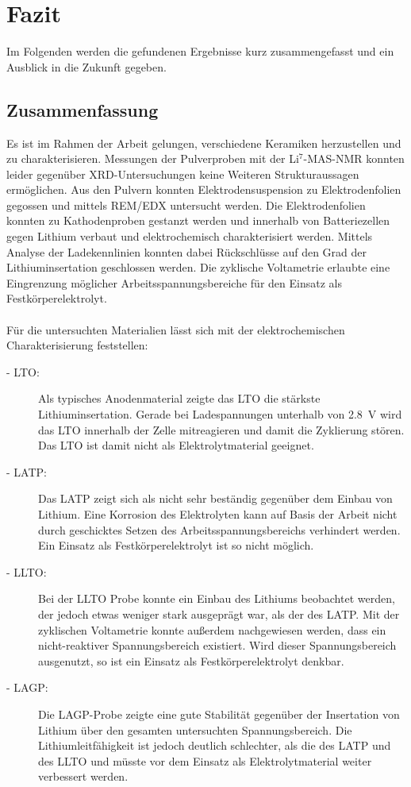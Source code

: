 \documentclass[a4paper, 11pt, headsepline,footsepline,twoside,abstract]{scrbook}
\begin{document}
\chapter{Fazit}
Im Folgenden werden die gefundenen Ergebnisse kurz zusammengefasst und ein Ausblick in die Zukunft gegeben.
\section{Zusammenfassung}
Es ist im Rahmen der Arbeit gelungen, verschiedene Keramiken herzustellen und zu charakterisieren. Messungen der Pulverproben mit der Li$^7$-MAS-NMR konnten leider gegenüber XRD-Untersuchungen keine Weiteren Strukturaussagen ermöglichen. Aus den Pulvern konnten Elektrodensuspension zu Elektrodenfolien gegossen und mittels REM/EDX untersucht werden. Die Elektrodenfolien konnten zu Kathodenproben gestanzt werden und innerhalb von Batteriezellen gegen Lithium verbaut und elektrochemisch charakterisiert werden. Mittels Analyse der Ladekennlinien konnten dabei Rückschlüsse auf den Grad der Lithiuminsertation geschlossen werden. Die zyklische Voltametrie erlaubte eine Eingrenzung möglicher Arbeitsspannungsbereiche für den Einsatz als Festkörperelektrolyt. %
\\\\
Für die untersuchten Materialien lässt sich mit der elektrochemischen Charakterisierung feststellen:
\begin{description}
\item[- LTO:] Als typisches Anodenmaterial zeigte das LTO die stärkste Lithiuminsertation. Gerade bei Ladespannungen unterhalb von \SI{2.8}{\volt} wird das LTO innerhalb der Zelle mitreagieren und damit die Zyklierung stören. Das LTO ist damit nicht als Elektrolytmaterial geeignet.
\item[- LATP:] Das LATP zeigt sich als nicht sehr beständig gegenüber dem Einbau von Lithium. Eine Korrosion des Elektrolyten kann auf Basis der Arbeit nicht durch geschicktes Setzen des Arbeitsspannungsbereichs verhindert werden. Ein Einsatz als Festkörperelektrolyt ist so nicht möglich.
\item[- LLTO:] Bei der LLTO Probe konnte ein Einbau des Lithiums beobachtet werden, der jedoch etwas weniger stark ausgeprägt war, als der des LATP. Mit der zyklischen Voltametrie konnte außerdem nachgewiesen werden, dass ein nicht-reaktiver Spannungsbereich existiert. Wird dieser Spannungsbereich ausgenutzt, so ist ein Einsatz als Festkörperelektrolyt denkbar.
\item[- LAGP:] Die LAGP-Probe zeigte eine gute Stabilität gegenüber der Insertation von Lithium über den gesamten untersuchten Spannungsbereich. Die Lithiumleitfähigkeit ist jedoch deutlich schlechter, als die des LATP und des LLTO und müsste vor dem Einsatz als Elektrolytmaterial weiter verbessert werden. 
\end{description}
\end{document}
